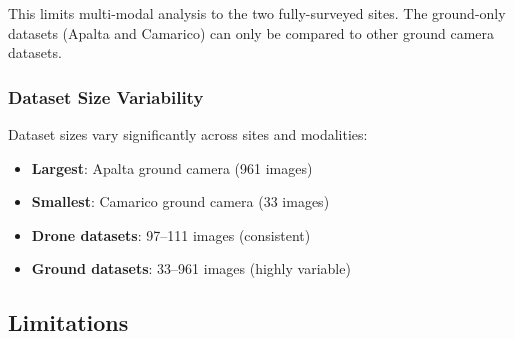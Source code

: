 This limits multi-modal analysis to the two fully-surveyed sites. The ground-only datasets (Apalta and Camarico) can only be compared to other ground camera datasets.

\subsubsection{Dataset Size Variability}

Dataset sizes vary significantly across sites and modalities:

\begin{itemize}
    \item \textbf{Largest}: Apalta ground camera (961 images)
    \item \textbf{Smallest}: Camarico ground camera (33 images)
    \item \textbf{Drone datasets}: 97--111 images (consistent)
    \item \textbf{Ground datasets}: 33--961 images (highly variable)
\end{itemize}


\subsection{Limitations}

